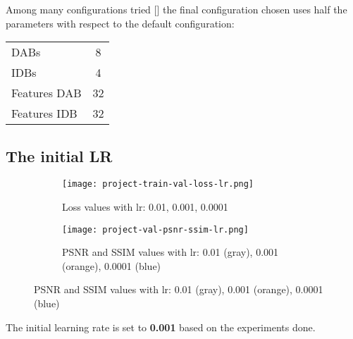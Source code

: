 Among many configurations tried [] the final configuration chosen uses half the parameters with respect to the default configuration:
\begin{tabular}{lc}
    DABs & 8\\
    IDBs & 4\\
    Features DAB & 32 \\
    Features IDB & 32 
\end{tabular}

\subsection{The initial LR}

\begin{figure}
    \begin{subfigure}{\textwidth}
        \centering
        \texttt{[image: project-train-val-loss-lr.png]}
        \caption{Loss values with lr: 0.01, 0.001, 0.0001}
    \end{subfigure}
    \begin{subfigure}{\textwidth}
        \centering
        \texttt{[image: project-val-psnr-ssim-lr.png]}
        \caption{PSNR and SSIM values with lr: 0.01 (gray), 0.001 (orange), 0.0001 (blue)}        
    \end{subfigure}
\end{figure}

The initial learning rate is set to \textbf{0.001} based on the experiments done.